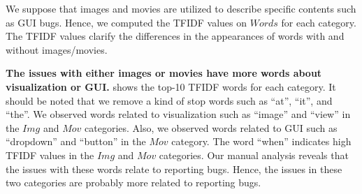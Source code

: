 We suppose that images and movies are utilized to 
describe specific contents such as GUI bugs. 
Hence, we computed the TFIDF values 
on $Words$ for each category. 
The TFIDF values clarify the differences in the appearances of 
words with and without images/movies. 

\textbf{The issues with either images or movies have 
more words about visualization or GUI.}
 shows the top-10 TFIDF words
for each category.
It should be noted that we remove a kind of stop words such as 
``at'', ``it'', and ``the''. 
We observed words related to visualization such as 
``image'' and ``view'' in the $Img$ and $Mov$ categories. 
Also, we observed words related to GUI such as 
``dropdown'' and ``button'' in the $Mov$ category. 
The word ``when'' indicates high TFIDF values 
in the $Img$ and $Mov$ categories. 
Our manual analysis reveals that the issues with 
these words relate to reporting bugs. 
Hence, the issues in these two categories are 
probably more related to reporting bugs. 
